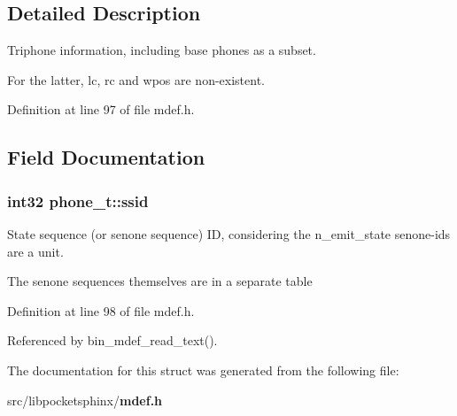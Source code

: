 \subsection{Detailed Description}
Triphone information, including base phones as a subset. 

For the latter, lc, rc and wpos are non-\/existent. 

Definition at line 97 of file mdef.\-h.



\subsection{Field Documentation}
\subsubsection[{ssid}]{\setlength{\rightskip}{0pt plus 5cm}int32 phone\-\_\-t\-::ssid}\label{structphone__t_af2f31836358c1c29c38a361b3923b859}


State sequence (or senone sequence) I\-D, considering the n\-\_\-emit\-\_\-state senone-\/ids are a unit. 

The senone sequences themselves are in a separate table 

Definition at line 98 of file mdef.\-h.



Referenced by bin\-\_\-mdef\-\_\-read\-\_\-text().



The documentation for this struct was generated from the following file\-:\begin{DoxyCompactItemize}
\item 
src/libpocketsphinx/{\bf mdef.\-h}\end{DoxyCompactItemize}
